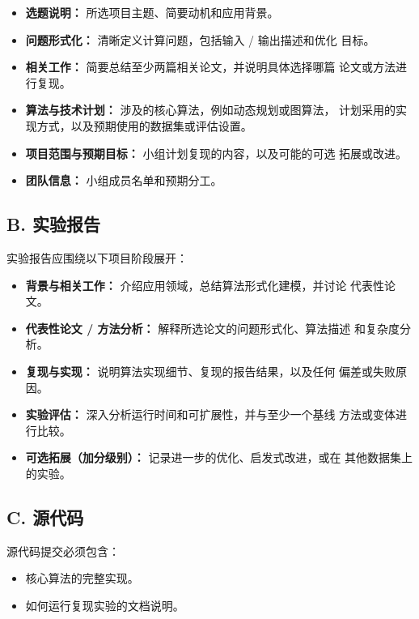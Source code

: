 \documentclass[UTF8, 10pt]{ctexart}
\begin{document}
\begin{itemize}
    \item \textbf{选题说明：} 所选项目主题、简要动机和应用背景。
    \item \textbf{问题形式化：} 清晰定义计算问题，包括输入 / 输出描述和优化
    目标。
    \item \textbf{相关工作：} 简要总结至少两篇相关论文，并说明具体选择哪篇
    论文或方法进行复现。
    \item \textbf{算法与技术计划：} 涉及的核心算法，例如动态规划或图算法，
    计划采用的实现方式，以及预期使用的数据集或评估设置。
    \item \textbf{项目范围与预期目标：} 小组计划复现的内容，以及可能的可选
    拓展或改进。
    \item \textbf{团队信息：} 小组成员名单和预期分工。
\end{itemize}

\subsection{B. 实验报告}

实验报告应围绕以下项目阶段展开：

\begin{itemize}
    \item \textbf{背景与相关工作：} 介绍应用领域，总结算法形式化建模，并讨论
    代表性论文。
    \item \textbf{代表性论文 / 方法分析：} 解释所选论文的问题形式化、算法描述
    和复杂度分析。
    \item \textbf{复现与实现：} 说明算法实现细节、复现的报告结果，以及任何
    偏差或失败原因。
    \item \textbf{实验评估：} 深入分析运行时间和可扩展性，并与至少一个基线
    方法或变体进行比较。
    \item \textbf{可选拓展（加分级别）：} 记录进一步的优化、启发式改进，或在
    其他数据集上的实验。
\end{itemize}

\subsection{C. 源代码}

源代码提交必须包含：

\begin{itemize}
    \item 核心算法的完整实现。
    \item 如何运行复现实验的文档说明。
\end{itemize}
\end{document}
